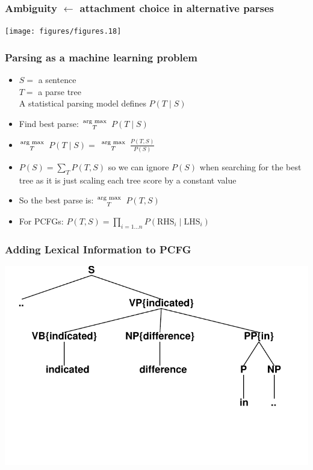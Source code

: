 \begin{frame}[fragile]
\frametitle{Ambiguity $\leftarrow$ attachment choice in alternative parses}
\texttt{[image: figures/figures.18]}
\end{frame}

\begin{frame}
\frametitle{Parsing as a machine learning problem}
\begin{itemize}
\item<1-> $S = $ a sentence \\
      $T = $ a parse tree \\
A statistical parsing model defines $P(T \mid S)$
\item<2-> Find best parse: $\textrm{arg max}\atop{T}$ $P(T \mid S)$
\item<3-> $\textrm{arg max}\atop{T}$ $P(T \mid S) =$ $\textrm{arg max}\atop{T}$ $\frac{P(T, S)}{P(S)}$
\item<4-> $P(S) = \sum_T P(T,S)$ so we can ignore $P(S)$ when searching for the best tree as it is just scaling each tree score by a constant value
\item<5-> So the best parse is: $\textrm{arg max}\atop{T}$ $P(T,S)$
\item<5-> For PCFGs: $P(T, S) = \prod_{i=1 \ldots n} P(\textrm{RHS}_i \mid \textrm{LHS}_i)$
\end{itemize}

\end{frame}

\newcommand{\code}[1]{\mbox{\tt #1}}

\begin{frame}
\frametitle{Adding Lexical Information to PCFG}
\centering
\includegraphics[scale=.7]{figures/bilexicalcfg0}
\end{frame}

